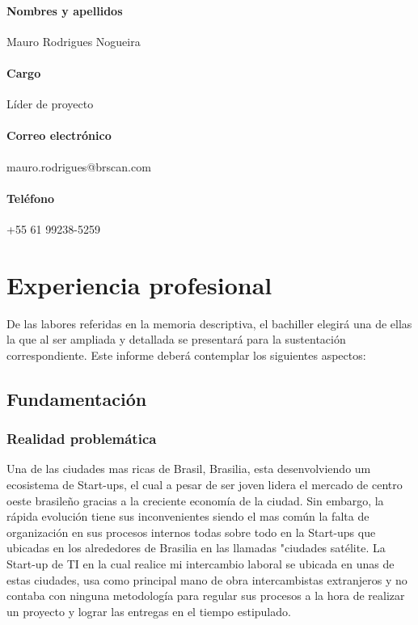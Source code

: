 \subsubsection{Nombres y apellidos} 
Mauro Rodrigues Nogueira

\subsubsection{Cargo} 
Líder de proyecto

\subsubsection{Correo electrónico} 
mauro.rodrigues@brscan.com

\subsubsection{Teléfono} 
+55 61 99238-5259





\chapter{Experiencia profesional}
De las labores referidas en la memoria descriptiva, el bachiller elegirá una de ellas la que al ser ampliada y detallada se presentará para la sustentación correspondiente. Este informe deberá contemplar los siguientes aspectos:

\section{Fundamentación}

\subsection{Realidad problemática}
Una de las ciudades mas ricas de Brasil, Brasilia, esta desenvolviendo um ecosistema de Start-ups, el cual a pesar de ser joven lidera el mercado de centro oeste brasileño gracias a la creciente economía de la ciudad. Sin embargo, la rápida evolución tiene sus inconvenientes siendo el mas común la falta de organización en sus procesos internos todas sobre todo en la Start-ups que ubicadas en los alrededores de Brasilia en las llamadas "ciudades satélite. La Start-up de TI en la cual realice mi intercambio laboral se ubicada en unas de estas ciudades, usa como principal mano de obra intercambistas extranjeros y no contaba con ninguna metodología para regular sus procesos a la hora de realizar un proyecto y lograr las entregas en el tiempo estipulado.


